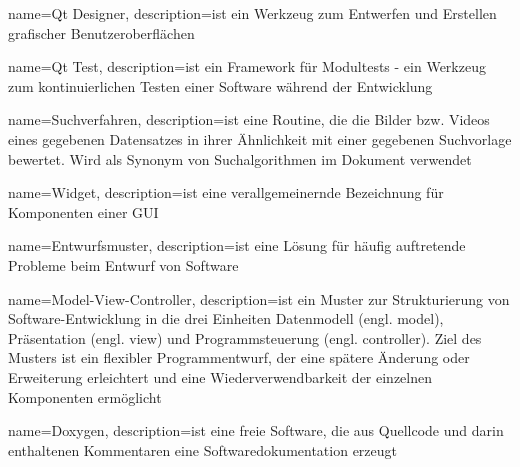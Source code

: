 {
name=Qt Designer,
description={ist ein Werkzeug zum Entwerfen und Erstellen grafischer Benutzeroberflächen}
}

{
name=Qt Test,
description={ist ein Framework für Modultests - ein Werkzeug zum kontinuierlichen Testen einer Software während der Entwicklung}
}

{
name=Suchverfahren,
description={ist eine Routine, die die Bilder bzw. Videos eines gegebenen Datensatzes in ihrer Ähnlichkeit mit einer gegebenen Suchvorlage bewertet. \newline Wird als Synonym von Suchalgorithmen im Dokument verwendet}
}

{
name=Widget,
description={ist eine verallgemeinernde Bezeichnung für Komponenten einer \gls{GUI}}
}

{
name=Entwurfsmuster,
description={ist eine Lösung für häufig auftretende Probleme beim Entwurf von Software}
}

{
name=Model-View-Controller,
description={ist ein Muster zur Strukturierung von Software-Entwicklung in die drei Einheiten Datenmodell (engl. model), Präsentation (engl. view) und Programmsteuerung (engl. controller). Ziel des Musters ist ein flexibler Programmentwurf, der eine spätere Änderung oder Erweiterung erleichtert und eine Wiederverwendbarkeit der einzelnen Komponenten ermöglicht}
}

{
name=Doxygen,
description={ist eine freie Software, die aus Quellcode und darin enthaltenen Kommentaren eine Softwaredokumentation erzeugt}
}
